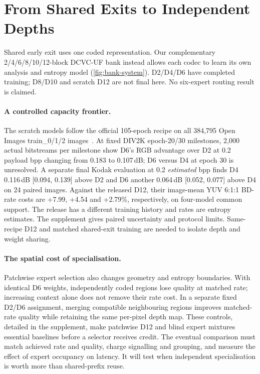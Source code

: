\section{From Shared Exits to Independent Depths}
\label{sec:depth}

Shared early exit uses one coded representation. Our complementary
2/4/6/8/10/12-block DCVC-UF bank instead allows each codec to learn
its own analysis and entropy model (\cref{fig:bank-system}). D2/D4/D6 have
completed training; D8/D10 and scratch D12 are not final here. No
six-expert routing result is claimed.

\paragraph{A controlled capacity frontier.}
The scratch models follow the official 105-epoch recipe on all 384,795
Open Images train\_0/1/2 images~\cite{microsoft2026training}. At fixed
DIV2K epoch-20/30 milestones, 2,000 actual bitstreams per milestone
show D6's RGB advantage over D2 at 0.2 payload bpp changing from
0.183 to 0.107\,dB; D6 versus D4 at epoch 30 is unresolved.
A separate final Kodak evaluation at 0.2 \emph{estimated} bpp finds D4
0.116\,dB [0.094, 0.139] above D2 and D6 another 0.064\,dB
[0.052, 0.077] above D4 on 24 paired images. Against the released D12,
their image-mean YUV 6:1:1 BD-rate costs are +7.99, +4.54 and +2.79\%,
respectively, on four-model common support. The release has a different
training history and rates are entropy estimates. The supplement gives
paired uncertainty and protocol limits. Same-recipe D12 and matched shared-exit training are needed
to isolate depth and weight sharing.

\paragraph{The spatial cost of specialisation.}
Patchwise expert selection also changes geometry and entropy boundaries.
With identical D6 weights, independently coded regions lose quality at
matched rate; increasing context alone does not remove their rate cost.
In a separate fixed D2/D6 assignment, merging compatible neighbouring
regions improves matched-rate quality while retaining the same per-pixel
depth map. These controls, detailed in the supplement, make patchwise D12
and blind expert mixtures essential baselines before a selector receives
credit. The eventual comparison must match achieved rate and quality,
charge signalling and grouping, and measure the effect of expert occupancy
on latency. It will test when independent specialisation is worth more
than shared-prefix reuse.
